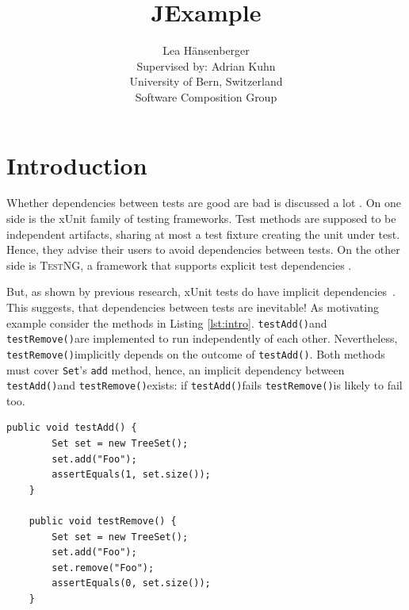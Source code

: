 \documentclass[11pt]{article}
\newcommand{\TestNG}{\textsc{TestNG}\xspace}
\newcommand{\ttt}[1]{\texttt{#1}}
\newcommand{\testAdd}{\ttt{testAdd()}}
\newcommand{\testRemove}{\ttt{testRemove()}}
\begin{document}
\title{JExample}

\author{Lea H\"ansenberger\\
	Supervised by: Adrian Kuhn\\
	University of Bern, Switzerland\\
	Software Composition Group
}

\maketitle

\begin{abstract}

\end{abstract}

\section{Introduction}

Whether dependencies between tests are good are bad is discussed a lot \cite{Deur01a,Fews99a,Mesz07a}.
On one side is the xUnit family of testing frameworks. Test methods are supposed to be independent artifacts, sharing at most a test fixture creating the unit under test. Hence, they advise their users to avoid dependencies between tests.
On the other side is \TestNG, a framework that supports explicit test dependencies \cite{Bues07a}.

But, as shown by previous research, xUnit tests do have implicit dependencies\ \cite{Gael04c}.
This suggests, that dependencies between tests are inevitable!
As motivating example consider the methods in Listing \ref{lst:intro}. \testAdd and \testRemove are implemented to run independently of each other. Nevertheless, \testRemove implicitly depends on the outcome of \testAdd. Both methods must cover \ttt{Set}'s \ttt{add} method, hence, an implicit dependency between \testAdd and \testRemove exists: if \testAdd fails \testRemove is likely to fail too.

\begin{lstlisting}[label=lst:intro,caption=Implicit dependency between test methods.]
    public void testAdd() {
    	Set set = new TreeSet();
        set.add("Foo");
        assertEquals(1, set.size());
    }

    public void testRemove() {
    	Set set = new TreeSet();
        set.add("Foo");
        set.remove("Foo");
        assertEquals(0, set.size());
    }
\end{lstlisting}
 
\end{document}

